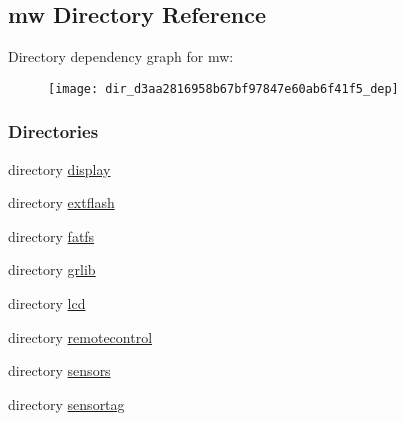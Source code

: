 \subsection{mw Directory Reference}
\label{dir_d3aa2816958b67bf97847e60ab6f41f5}
Directory dependency graph for mw\+:
\nopagebreak
\begin{figure}[H]
\begin{center}
\leavevmode
\texttt{[image: dir\_d3aa2816958b67bf97847e60ab6f41f5\_dep]}
\end{center}
\end{figure}
\subsubsection*{Directories}
\begin{DoxyCompactItemize}
\item 
directory \hyperlink{dir_aa38a108c49855a9f9e08775482d153b}{display}
\item 
directory \hyperlink{dir_97bf21994f5f4d8af7fc0978a06d5d53}{extflash}
\item 
directory \hyperlink{dir_97f033d72163b21755fa7c77182cf85a}{fatfs}
\item 
directory \hyperlink{dir_c2e49eb924fc2419a25f41e13c1f4f53}{grlib}
\item 
directory \hyperlink{dir_937f601288ada3465d5ed1abaff7aa8f}{lcd}
\item 
directory \hyperlink{dir_744731499ed0dbc2c0b63ef5ab01ba02}{remotecontrol}
\item 
directory \hyperlink{dir_8b9c307fae2138fab6d710d1cee5b891}{sensors}
\item 
directory \hyperlink{dir_55dc2688eb57b62afbbb59c19166c515}{sensortag}
\end{DoxyCompactItemize}
